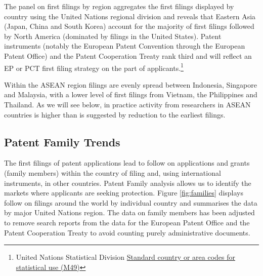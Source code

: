 \documentclass[]{book}
\theoremstyle{definition}
\theoremstyle{definition}
\theoremstyle{definition}
\theoremstyle{remark}
\begin{document}
The panel on first filings by region aggregates the first filings
displayed by country using the United Nations regional division and
reveals that Eastern Asia (Japan, China and South Korea) account for the
majority of first filings followed by North America (dominated by
filings in the United States). Patent instruments (notably the European
Patent Convention through the European Patent Office) and the Patent
Cooperation Treaty rank third and will reflect an EP or PCT first filing
strategy on the part of applicants.\footnote{United Nations Statistical
  Division \href{https://unstats.un.org/unsd/methodology/m49/}{Standard
  country or area codes for statistical use (M49)}}

Within the ASEAN region filings are evenly spread between Indonesia,
Singapore and Malaysia, with a lower level of first filings from
Vietnam, the Philippines and Thailand. As we will see below, in practice
activity from researchers in ASEAN countries is higher than is suggested
by reduction to the earliest filings.

\hypertarget{patent-family-trends}{%
\subsection{Patent Family Trends}\label{patent-family-trends}}

The first filings of patent applications lead to follow on applications
and grants (family members) within the country of filing and, using
international instruments, in other countries. Patent Family analysis
allows us to identify the markets where applicants are seeking
protection. Figure \ref{fig:families} displays follow on filings around
the world by individual country and summarises the data by major United
Nations region. The data on family members has been adjusted to remove
search reports from the data for the European Patent Office and the
Patent Cooperation Treaty to avoid counting purely administrative
documents.
\end{document}
